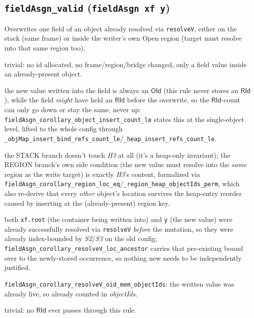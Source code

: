 \documentclass[11pt]{article}
\newcommand{\op}[1]{\texttt{#1}}
\newcommand{\thm}[1]{\textbf{\texttt{#1}}}
\begin{document}
\subsection{\thm{fieldAsgn\_valid} (\op{fieldAsgn xf y})}
Overwrites one field of an object already resolved via \op{resolveV}, either on the stack (same
frame) or inside the writer's own Open region (target must resolve into that same region too).
\begin{description}[nosep]
  \item[L1, L2, S1, H1] trivial: no id allocated, no frame/region/bridge changed, only a field
    value inside an already-present object.
  \item[H2] the new value written into the field is always an $\mathsf{OId}$ (this rule never
    stores an $\mathsf{RId}$), while the field \emph{might} have held an $\mathsf{RId}$ before the
    overwrite, so the $\mathsf{RId}$-count can only go down or stay the same, never up:
    \texttt{fieldAsgn\_corollary\_object\_insert\_count\_le} states this at the single-object
    level, lifted to the whole config through
    \texttt{\_objMap\_insert\_bind\_refs\_count\_le}/\texttt{\_heap\_insert\_refs\_count\_le}.
  \item[H3] the STACK branch doesn't touch \textit{H3} at all (it's a heap-only invariant); the
    REGION branch's own side condition (the new value must resolve into the \emph{same} region as
    the write target) is exactly \textit{H3}'s content, formalized via
    \texttt{fieldAsgn\_corollary\_region\_loc\_eq}/\texttt{\_region\_heap\_objectIds\_perm}, which
    also re-derive that every \emph{other} object's location survives the heap-entry reorder
    caused by inserting at the (already-present) region key.
  \item[S2, S3] both \op{xf.root} (the container being written into) and \op{y} (the new value)
    were already successfully resolved via \op{resolveV} \emph{before} the mutation, so they were
    already index-bounded by \textit{S2}/\textit{S3} on the old config;
    \texttt{fieldAsgn\_corollary\_resolveV\_loc\_ancestor} carries that pre-existing bound over to
    the newly-stored occurrence, so nothing new needs to be independently justified.
  \item[HS1] \texttt{fieldAsgn\_corollary\_resolveV\_oid\_mem\_objectIds}: the written value was
    already live, so already counted in \textit{objectIds}.
  \item[HS2] trivial: no $\mathsf{RId}$ ever passes through this rule.
\end{description}
\end{document}
